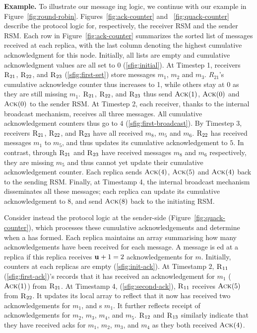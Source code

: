 \par \textbf{Example.} To illustrate our message \quack{}ing logic, 
we continue with our example in Figure~\ref{fig:round-robin}.
Figures~\ref{fig:ack-counter} and ~\ref{fig:quack-counter} describe the protocol logic for, respectively, the receiver RSM and the sender RSM.  
Each row in Figure~\ref{fig:ack-counter} summarizes the sorted list of messages received at each replica, 
with the last column denoting the highest cumulative acknowledgment for this node.
Initially, all lists are empty and cumulative acknowledgment values are all set to $0$ (\ref{sfig:initial}). 
At Timestep 1, 
receivers $\textsc{R}_{{2}{1}}$, $\textsc{R}_{{2}{2}}$, and $\textsc{R}_{{2}{3}}$ (\ref{sfig:first-set}) store messages $m_1$, $m_2$ and $m_3$.
$R_{21}$'s cumulative acknowledge counter thus increases to 1, while others stay at 0 as they are still missing $m_1$. 
$\textsc{R}_{{2}{1}}$, $\textsc{R}_{{2}{2}}$, and $\textsc{R}_{{2}{3}}$ thus send $\textsc{Ack}(1)$, $\textsc{Ack}(0)$ and $\textsc{Ack}(0)$ to the sender RSM.
At Timestep 2, each receiver, thanks to the internal broadcast mechanism, receives all three messages. All cumulative acknowledgement counters thus go to $4$ (\ref{sfig:first-broadcast}). By Timestep 3, receivers $\textsc{R}_{{2}{1}}$, $\textsc{R}_{{2}{2}}$, and $\textsc{R}_{{2}{3}}$ have all received $m_8$, $m_5$ and $m_6$.
$\textsc{R}_{{2}{2}}$ has received messages $m_1$ to $m_5$, and thus updates its cumulative acknowledgement to $5$. In contrast,
through $\textsc{R}_{{2}{1}}$ and $\textsc{R}_{{2}{3}}$ have received messages $m_8$ and $m_6$ respectively, they are missing $m_5$ and thus cannot
yet update their cumulative acknowledgement counter. Each replica sends $\textsc{Ack}(4)$, $\textsc{Ack}(5)$ and $\textsc{Ack}(4)$ back to the sending RSM.
Finally, at Timestamp 4, the internal broadcast mechanism disseminates all these messages; each replica can update its cumulative acknowledgement to 8, and send $\textsc{Ack}(8)$ back to the initiating RSM. 

Consider instead the protocol logic at the sender-side (Figure~\ref{fig:quack-counter}), which processes these cumulative acknowledgements and determine when a \quack{}
has formed. Each replica maintains an array summarising how many acknowledgements have been received for each message. A message is \quack{}ed at a replica if this replica receives $\textbf{u}_{}+1=2$ acknowledgements for $m$.
 Initially, \quack{} counters at each replicas are empty (\ref{sfig:init-ack}). At Timestamp $2$, $\textsc{R}_{{1}{1}}$
(\ref{sfig:first-ack})'s records that it has received an acknowledgement for $m_1$  ($\textsc{Ack}(1)$) from $\textsc{R}_{{2}{1}}$. 
At Timestamp 4, (\ref{sfig:second-ack}), $\textsc{R}_{{1}{1}}$ receives $\textsc{Ack}(5)$ from $\textsc{R}_{{2}{2}}$. It updates its local array
to reflect that it now has received two acknowledgements for $m_1$, and \quack{}s $m_1$. It further reflects receipt of acknowledgements
for $m_2$, $m_3$, $m_4$, and $m_5$. $\textsc{R}_{{1}{2}}$ and $\textsc{R}_{{1}{3}}$ similarly indicate that they have received acks for $m_1$, $m_2$, $m_3$, and $m_4$
as they both received $\textsc{Ack}(4)$. 


